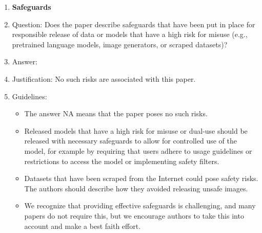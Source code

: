 \documentclass{article}
\begin{document}
\begin{enumerate}
\item {\bf Safeguards}
    \item[] Question: Does the paper describe safeguards that have been put in place for responsible release of data or models that have a high risk for misuse (e.g., pretrained language models, image generators, or scraped datasets)?
    \item[] Answer: \answerNA{} %
    \item[] Justification: No such risks are associated with this paper.
    \item[] Guidelines:
    \begin{itemize}
        \item The answer NA means that the paper poses no such risks.
        \item Released models that have a high risk for misuse or dual-use should be released with necessary safeguards to allow for controlled use of the model, for example by requiring that users adhere to usage guidelines or restrictions to access the model or implementing safety filters. 
        \item Datasets that have been scraped from the Internet could pose safety risks. The authors should describe how they avoided releasing unsafe images.
        \item We recognize that providing effective safeguards is challenging, and many papers do not require this, but we encourage authors to take this into account and make a best faith effort.
    \end{itemize}


\end{enumerate}
\end{document}
